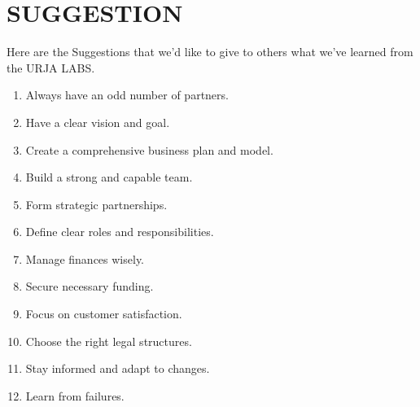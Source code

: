 \chapter{SUGGESTION}

Here are the Suggestions that we'd like to give to others what we've learned from the URJA LABS.

\begin{enumerate}
    \item Always have an odd number of partners.
    \item Have a clear vision and goal.
    \item Create a comprehensive business plan and model.
    \item Build a strong and capable team.
    \item Form strategic partnerships.
    \item Define clear roles and responsibilities.
    \item Manage finances wisely.
    \item Secure necessary funding.
    \item Focus on customer satisfaction.
    \item Choose the right legal structures.
    \item Stay informed and adapt to changes.
    \item Learn from failures.
    
\end{enumerate}